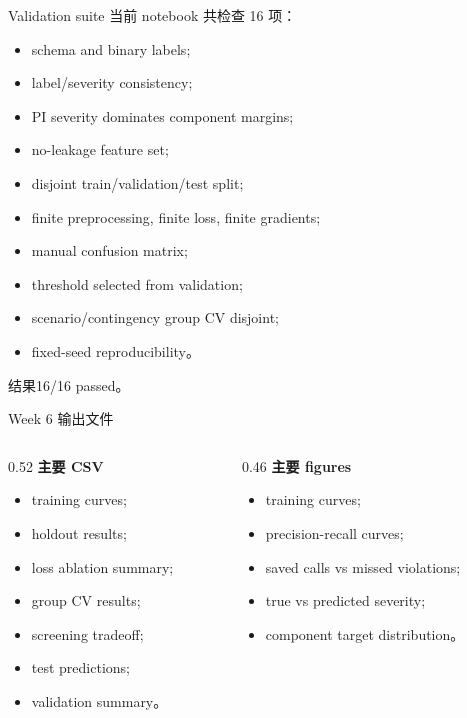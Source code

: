 \documentclass[aspectratio=169,11pt]{beamer}
\begin{document}
\begin{frame}{Validation suite}
当前 notebook 共检查 16 项：
\begin{itemize}
  \item schema and binary labels;
  \item label/severity consistency;
  \item PI severity dominates component margins;
  \item no-leakage feature set;
  \item disjoint train/validation/test split;
  \item finite preprocessing, finite loss, finite gradients;
  \item manual confusion matrix;
  \item threshold selected from validation;
  \item scenario/contingency group CV disjoint;
  \item fixed-seed reproducibility。
\end{itemize}
\begin{block}{结果}16/16 passed。\end{block}
\end{frame}

\begin{frame}{Week 6 输出文件}
\begin{columns}
\begin{column}{0.52\textwidth}
\textbf{主要 CSV}
\begin{itemize}
  \item training curves;
  \item holdout results;
  \item loss ablation summary;
  \item group CV results;
  \item screening tradeoff;
  \item test predictions;
  \item validation summary。
\end{itemize}
\end{column}
\begin{column}{0.46\textwidth}
\textbf{主要 figures}
\begin{itemize}
  \item training curves;
  \item precision-recall curves;
  \item saved calls vs missed violations;
  \item true vs predicted severity;
  \item component target distribution。
\end{itemize}
\end{column}
\end{columns}
\end{frame}
\end{document}
